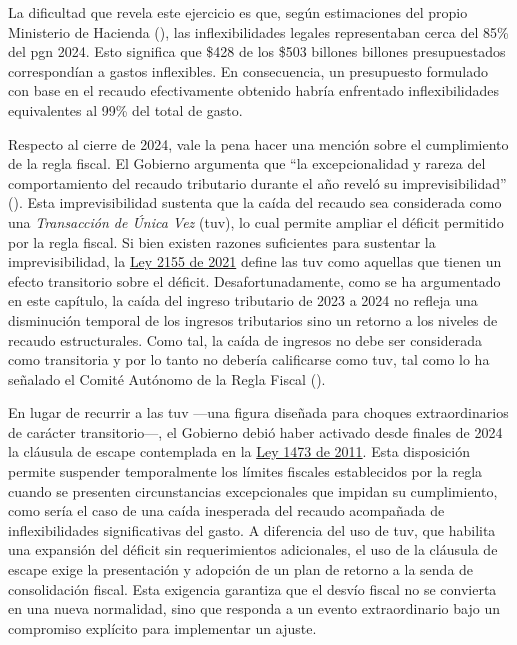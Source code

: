La dificultad que revela este ejercicio es que, según estimaciones del propio Ministerio de Hacienda (\cite{Bonilla2025}), las inflexibilidades legales representaban cerca del 85\% del \gls{pgn} 2024. Esto significa que \$428 de los \$503 billones billones presupuestados correspondían a gastos inflexibles. En consecuencia, un presupuesto formulado con base en el recaudo efectivamente obtenido habría enfrentado inflexibilidades equivalentes al 99\% del total de gasto. 

Respecto al cierre de 2024, vale la pena hacer una mención sobre el cumplimiento de la regla fiscal. El Gobierno argumenta que ``la excepcionalidad y rareza del comportamiento del recaudo tributario durante el año reveló su imprevisibilidad'' (\cite{DocumentoTUV2024}). Esta imprevisibilidad sustenta que la caída del recaudo sea considerada como una \textit{Transacción de Única Vez} (\gls{tuv}), lo cual permite ampliar el déficit permitido por la regla fiscal. Si bien existen razones suficientes para sustentar la imprevisibilidad, la \href{https://www.funcionpublica.gov.co/eva/gestornormativo/norma.php?i=170902}{Ley 2155 de 2021} define las \gls{tuv} como aquellas que tienen un efecto transitorio sobre el déficit. Desafortunadamente, como se ha argumentado en este capítulo, la caída del ingreso tributario de 2023 a 2024 no refleja una disminución temporal de los ingresos tributarios sino un retorno a los niveles de recaudo estructurales. Como tal, la caída de ingresos no debe ser considerada como transitoria y por lo tanto no debería calificarse como \gls{tuv}, tal como lo ha señalado el Comité Autónomo de la Regla Fiscal (\cite{CARF2025}).

En lugar de recurrir a las \gls{tuv} —una figura diseñada para choques extraordinarios de carácter transitorio—, el Gobierno debió haber activado desde finales de 2024 la cláusula de escape contemplada en la \href{http://www.secretariasenado.gov.co/senado/basedoc/ley_1473_2011.html}{Ley 1473 de 2011}. Esta disposición permite suspender temporalmente los límites fiscales establecidos por la regla cuando se presenten circunstancias excepcionales que impidan su cumplimiento, como sería el caso de una caída inesperada del recaudo acompañada de inflexibilidades significativas del gasto. A diferencia del uso de \gls{tuv}, que habilita una expansión del déficit sin requerimientos adicionales, el uso de la cláusula de escape exige la presentación y adopción de un plan de retorno a la senda de consolidación fiscal. Esta exigencia garantiza que el desvío fiscal no se convierta en una nueva normalidad, sino que responda a un evento extraordinario bajo un compromiso explícito para implementar un ajuste.  

